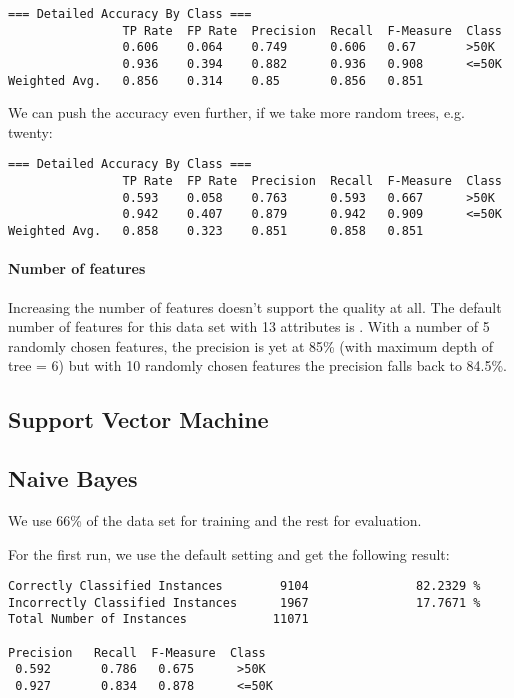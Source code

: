 \documentclass[paper=a4, fontsize=11pt]{scrartcl} %
\numberwithin{equation}{section} %
\numberwithin{figure}{section} %
\numberwithin{table}{section} %
\begin{document}
\begin{lstlisting}
=== Detailed Accuracy By Class ===
                TP Rate  FP Rate  Precision  Recall  F-Measure  Class
                0.606    0.064    0.749      0.606   0.67       >50K
                0.936    0.394    0.882      0.936   0.908      <=50K
Weighted Avg.   0.856    0.314    0.85       0.856   0.851     
\end{lstlisting}
We can push the accuracy even further, if we take more random trees, e.g. twenty:
\begin{lstlisting}
=== Detailed Accuracy By Class ===
                TP Rate  FP Rate  Precision  Recall  F-Measure  Class
                0.593    0.058    0.763      0.593   0.667      >50K
                0.942    0.407    0.879      0.942   0.909      <=50K
Weighted Avg.   0.858    0.323    0.851      0.858   0.851      
\end{lstlisting}

\paragraph{Number of features}
Increasing the number of features doesn't support the quality at all. The default number of features for this data set with 13 attributes is . With a number of 5 randomly chosen features, the precision is yet at 85\% (with maximum depth of tree = 6) but with 10 randomly chosen features the precision falls back to 84.5\%.
\subsection{Support Vector Machine}




\subsection{Naive Bayes}

We use 66\% of the data set for training and the rest for evaluation.

For the first run, we use the default setting and get the following result:

\begin{verbatim}
Correctly Classified Instances        9104               82.2329 %
Incorrectly Classified Instances      1967               17.7671 %
Total Number of Instances            11071     

Precision   Recall  F-Measure  Class
 0.592       0.786   0.675      >50K
 0.927       0.834   0.878      <=50K
\end{verbatim}
\end{document}
